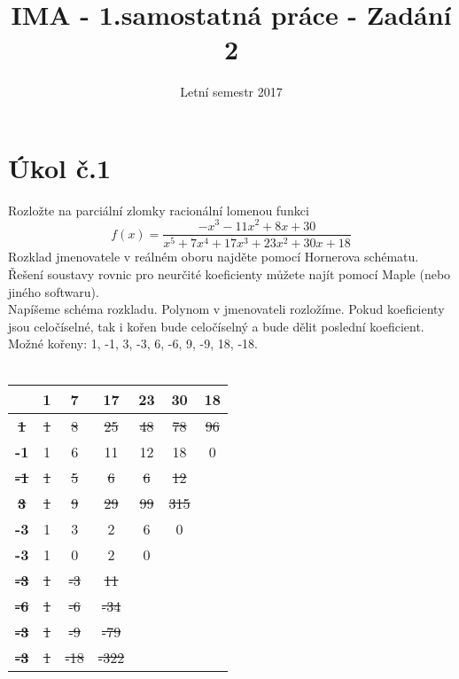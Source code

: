 \documentclass{article}
\title{IMA - 1.samostatná práce - Zadání 2}
\date{Letní semestr 2017}
\author{}
\begin{document}
\maketitle

\section{Úkol č.1}
 Rozložte na parciální zlomky racionální lomenou funkci 
 $$ f(x)=\frac{-x^3-11x^2+8x+30}{x^5+7x^4+17x^3+23x^2+30x+18} $$
 Rozklad jmenovatele v reálném oboru najděte pomocí Hornerova schématu. Řešení soustavy rovnic pro neurčité koeficienty můžete najít pomocí Maple (nebo jiného softwaru). \\
  
Napíšeme schéma rozkladu. Polynom v jmenovateli rozložíme. Pokud koeficienty jsou celočíselné, tak i kořen bude celočíselný a bude dělit poslední koeficient.
\\
Možné kořeny: 1, -1, 3, -3, 6, -6, 9, -9, 18, -18.
\\ \\ 

$ \quad\quad\quad\quad\quad\quad\quad\quad\quad\quad\quad\quad\quad\quad$
\begin{tabular}{c | c c c c c c}
 &\bfseries1 &\bfseries 7 &\bfseries 17 &\bfseries 23\bfseries &\bfseries 30 &\bfseries 18 \\ \hline
 
\rowcolor{grey!10}\bfseries \st{1} & \st{1} & \st{8} & \st{25} & \st{48} & \st{78} & \st{96} \\

\cellcolor{green!25}\bfseries -1 & 1 & 6 & 11 & 12 & 18 &\cellcolor{green!25} 0 \\

\rowcolor{grey!10}\bfseries \st{-1} & \st{1} & \st{5} & \st{6} & \st{6} & \st{12} &  \\

\bfseries \st{3} & \st{1} & \st{9} & \st{29} & \st{99} & \st{315} &  \\

\cellcolor{green!25}\rowcolor{grey!10}\bfseries -3 & 1 & 3 & 2 & 6 &\cellcolor{green!25} 0 &  \\

\cellcolor{green!25}\bfseries -3 & 1 & 0 & 2 &\cellcolor{green!25} 0 &  & \\

\rowcolor{grey!10}\bfseries \st{-3} & \st{1} & \st{-3} & \st{11} &  &  &  \\
\rowcolor{grey!10}\bfseries \st{-6} & \st{1} & \st{-6} & \st{-34} &  &  &  \\
\rowcolor{grey!10}\bfseries \st{-3} & \st{1} & \st{-9} & \st{-79} &  &  &  \\
\rowcolor{grey!10}\bfseries \st{-3} & \st{1} & \st{-18} & \st{-322} &  &  &  \\

\end{tabular}
\end{document}
